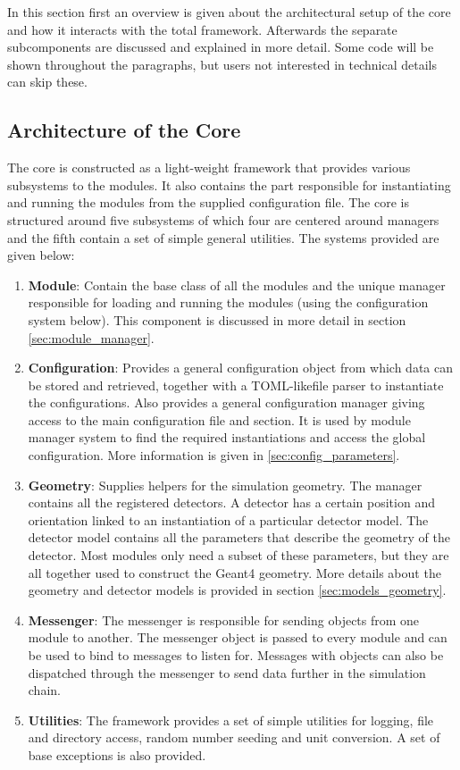 In this section first an overview is given about the architectural setup of the core and how it interacts with the total \apsq framework. Afterwards the separate subcomponents are discussed and explained in more detail. Some code will be shown throughout the paragraphs, but users not interested in technical details can skip these.

\subsection{Architecture of the Core}
The core is constructed as a light-weight framework that provides various subsystems to the modules. It also contains the part responsible for instantiating and running the modules from the supplied configuration file. The core is structured around five subsystems of which four are centered around managers and the fifth contain a set of simple general utilities. The systems provided are given below:
\begin{enumerate}
\item \textbf{Module}: Contain the base class of all the \apsq modules and the unique manager responsible for loading and running the modules (using the configuration system below). This component is discussed in more detail in section \ref{sec:module_manager}. 
\item \textbf{Configuration}: Provides a general configuration object from which data can be stored and retrieved, together with a TOML-like\needref file parser to instantiate the configurations. Also provides a general \apsq configuration manager giving access to the main configuration file and section. It is used by module manager system to find the required instantiations and access the global configuration. More information is given in \ref{sec:config_parameters}.
\item \textbf{Geometry}: Supplies helpers for the simulation geometry. The manager contains all the registered detectors. A detector has a certain position and orientation linked to an instantiation of a particular detector model. The detector model contains all the parameters that describe the geometry of the detector. Most modules only need a subset of these parameters, but they are all together used to construct the Geant4 geometry. More details about the geometry and detector models is provided in section \ref{sec:models_geometry}.
\item \textbf{Messenger}: The messenger is responsible for sending objects from one module to another. The messenger object is passed to every module and can be used to bind to messages to listen for. Messages with objects can also be dispatched through the messenger to send data further in the simulation chain.
\item \textbf{Utilities}: The framework provides a set of simple utilities for logging, file and directory access, random number seeding and unit conversion. A set of base exceptions is also provided.
\end{enumerate}


